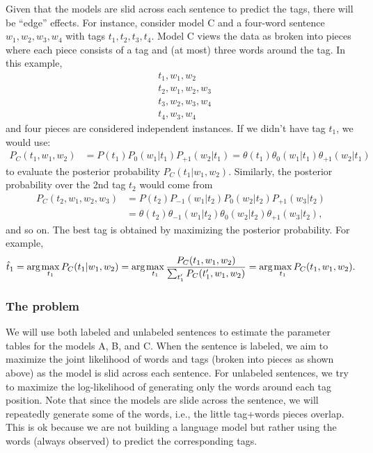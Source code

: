Given that the models are slid across each sentence to predict the tags, there will be ``edge'' effects. 
For instance, consider model C and a four-word sentence $w_1,w_2,w_3,w_4$ with tags $t_1,t_2,t_3,t_4$. Model C views the data as broken into pieces where each piece consists of a tag and (at most) three words around the tag. In this example, 
\begin{align*}
&t_1,w_1,w_2\\
&t_2,w_1,w_2,w_3\\
&t_3,w_2,w_3,w_4\\
&t_4,w_3,w_4
\end{align*}
and four pieces are considered independent instances. If we didn't have tag $t_1$, we would use:
\begin{align*}
P_C(t_1,w_1,w_2) &= P(t_1)P_{0}(w_{1}|t_1)P_{+1}(w_{2}|t_1)=\theta(t_1)\theta_{0}(w_{1}|t_1)\theta_{+1}(w_2|t_1)
\end{align*}
to evaluate the posterior probability $P_C(t_1|w_1,w_2)$. Similarly, the posterior probability over the 2nd tag $t_2$ would come from
\begin{align*}
P_C(t_2,w_1,w_2,w_3)& = P(t_2)P_{-1}(w_{1}|t_2)P_{0}(w_{2}|t_2)P_{+1}(w_{3}|t_2)\\
  & =  \theta(t_2)
\theta_{-1}(w_{1}|t_2)\theta_{0}(w_{2}|t_2)\theta_{+1}(w_3|t_2),
\end{align*}
and so on. The best tag is obtained by maximizing the posterior probability. For example,
\[
\hat t_1 = {\mbox{arg}\hspace{-.1ex}}\max_{t_1} P_C(t_1|w_1,w_2) =
{\mbox{arg}\hspace{-.1ex}}\max_{t_1} \frac{P_C(t_1,w_1,w_2)}{\sum_{t'_1} P_C(t'_1,w_1,w_2)}
= {\mbox{arg}\hspace{-.1ex}}\max_{t_1} P_C(t_1,w_1,w_2).
\]

\subsubsection*{The problem}

We will use both labeled and unlabeled sentences to estimate the parameter tables for the models A, B, and C. When the sentence is labeled, we aim to maximize the joint likelihood of words and tags (broken into pieces as shown above) as the model is slid across each sentence. For unlabeled sentences, we try to maximize the log-likelihood of generating only the words around each tag position. Note that since the models are slide across the sentence, we will repeatedly generate some of the words, i.e., the little tag+words pieces overlap. This is ok because we are not building a language model but rather using the words (always observed) to predict the corresponding tags. 

